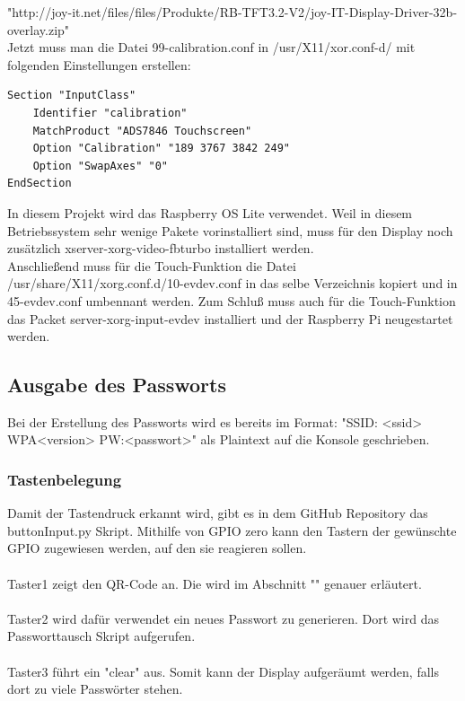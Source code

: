 \documentclass[a4paper,11pt,singlespacing]{article}
\begin{document}
			"http://joy-it.net/files/files/Produkte/RB-TFT3.2-V2/joy-IT-Display-Driver-32b-overlay.zip" \\

    		Jetzt muss man die Datei 99-calibration.conf in /usr/X11/xor.conf-d/ mit folgenden Einstellungen erstellen:
    		\begin{lstlisting}
Section "InputClass"
	Identifier "calibration"
	MatchProduct "ADS7846 Touchscreen"
	Option "Calibration" "189 3767 3842 249"
	Option "SwapAxes" "0"
EndSection
    		\end{lstlisting}
 
			In diesem Projekt wird das Raspberry OS Lite verwendet. Weil in diesem Betriebssystem sehr wenige Pakete vorinstalliert sind, muss für den Display noch zusätzlich xserver-xorg-video-fbturbo installiert werden. \\
			Anschließend muss für die Touch-Funktion die Datei /usr/share/X11/xorg.conf.d/10-evdev.conf in das selbe Verzeichnis kopiert und in 45-evdev.conf umbennant werden. Zum Schluß muss auch für die Touch-Funktion das Packet server-xorg-input-evdev installiert und der Raspberry Pi neugestartet werden.

    		
    	\subsection{Ausgabe des Passworts}
    		
    		Bei der Erstellung des Passworts wird es bereits im Format: "SSID: <ssid> WPA<version> PW:<passwort>" als Plaintext auf die Konsole geschrieben.
    		\subsubsection{Tastenbelegung}
    		    Damit der Tastendruck erkannt wird, gibt es in dem GitHub Repository \cite{Quote_github_repo} das buttonInput.py Skript. Mithilfe von GPIO zero kann den Tastern der gewünschte GPIO zugewiesen werden, auf den sie reagieren sollen. \\\\
	    		Taster1 zeigt den QR-Code an. Die wird im Abschnitt "" genauer erläutert. \\\\
	    		Taster2 wird dafür verwendet ein neues Passwort zu generieren. Dort wird das Passworttausch Skript aufgerufen. \\\\
	    		Taster3 führt ein "clear" aus. Somit kann der Display aufgeräumt werden, falls dort zu viele Passwörter stehen.
    		
\end{document}
